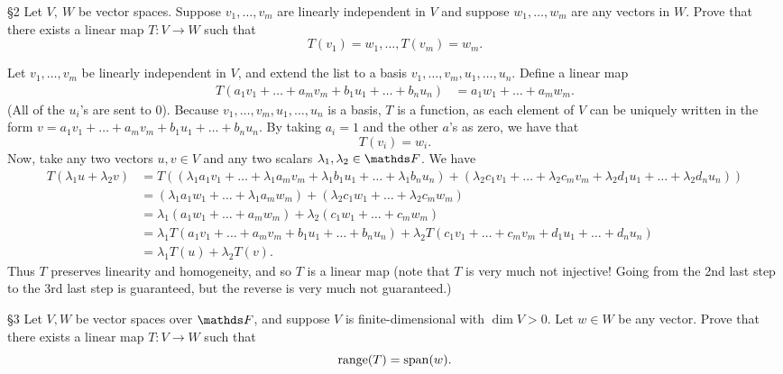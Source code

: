 \documentclass{homework}
\begin{document}
\begin{problem}{\S 2}
  Let $V,\ W$ be vector spaces. Suppose $v_1,\ldots,v_m$ are linearly independent in $V$ and suppose
  $w_1,\ldots,w_m$ are any vectors in $W$. Prove that there exists a linear map $T:V\to W$ such that
  \[
    T(v_1)=w_1,\ldots,T(v_m)=w_m
  .\] 
\end{problem}

\begin{solution}
  Let $v_1,\ldots,v_m$ be linearly independent in $V$, and extend the list to a basis
  $v_1,\ldots,v_m,u_1,\ldots,u_n$. Define a linear map \begin{align*}
    T(a_1v_1+\ldots+a_mv_m+b_1u_1+\ldots+b_nu_n) &= a_1w_1+\ldots+a_mw_m
  .\end{align*}
  (All of the $u_i$'s are sent to $0$). Because $v_1,\ldots,v_m,u_1,\ldots,u_n$ is a basis, $T$ is a
  function, as each element of $V$ can be uniquely written in the form
  $v=a_1v_1+\ldots+a_mv_m+b_1u_1+\ldots+b_nu_n$. By taking $a_i=1$ and the other $a$'s as zero, we
  have that \[
    T(v_i)=w_i
  .\] Now, take any two vectors $u,v\in V$ and any two scalars $\lambda_1,\lambda_2\in \F$. We have
  \begin{align*}
    T(\lambda_1u+\lambda_2v)&=
    T((\lambda_1a_1v_1+\ldots+\lambda_1a_mv_m+\lambda_1b_1u_1+\ldots+\lambda_1b_nu_n)+(\lambda_2c_1v_1+\ldots+\lambda_2c_mv_m+\lambda_2d_1u_1+\ldots+\lambda_2d_nu_n))\\
          &=(\lambda_1a_1w_1+\ldots+\lambda_1a_mw_m) +(\lambda_2c_1w_1+\ldots+\lambda_2c_mw_m)\\
          &=\lambda_1(a_1w_1+\ldots+a_mw_m) +\lambda_2(c_1w_1+\ldots+c_mw_m)\\
          &= \lambda_1T(a_1v_1+\ldots+a_mv_m+b_1u_1+\ldots+b_nu_n)
          +\lambda_2T(c_1v_1+\ldots+c_mv_m+d_1u_1+\ldots+d_nu_n)\\
          &= \lambda_1T(u) + \lambda_2T(v)
        .\end{align*} Thus $T$ preserves linearity and homogeneity, and so $T$ is a linear map (note
        that $T$ is very much not injective! Going from the 2nd last step to the 3rd last step is
        guaranteed, but the reverse is very much not guaranteed.)
\end{solution}

\begin{problem}{\S 3}
  Let $V,W$ be vector spaces over $\F$, and suppose $V$ is finite-dimensional with $\dim V >0$. Let
  $w\in W$ be any vector. Prove that there exists a linear map $T:V\to W$ such that \[
    \operatorname{range}(T)=\operatorname{span}(w)
  .\] 
\end{problem}
\end{document}
